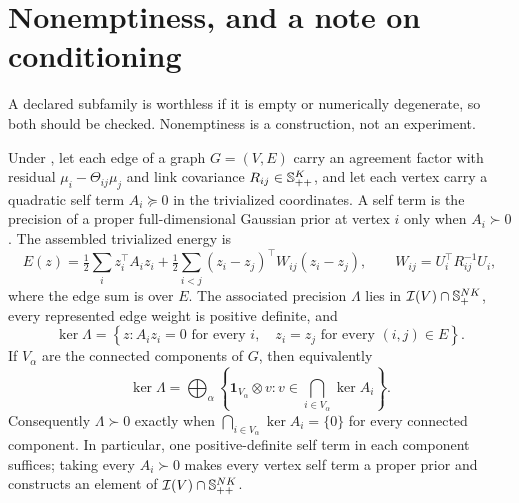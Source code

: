 \section{Nonemptiness, and a note on conditioning}
\label{sec:gauss-nonempty}

A declared subfamily is worthless if it is empty or numerically degenerate, so both should be checked. Nonemptiness is a construction, not an experiment.

Under , let each edge of a graph
$G=(V,E)$ carry an agreement factor with residual
$\mu_i-\Theta_{ij}\mu_j$ and link covariance
$R_{ij}\in\mathbb S_{++}^{K}$, and let each vertex carry a quadratic self
term $A_i\succeq0$ in the trivialized coordinates. A self term is the
precision of a proper full-dimensional Gaussian prior at vertex $i$ only
when $A_i\succ0$. The assembled trivialized energy is
\begin{equation}
E(z)=\tfrac12\sum_{i}z_i^\top A_iz_i
+\tfrac12\sum_{i<j}\left(z_i-z_j\right)^\top W_{ij}\left(z_i-z_j\right),
\qquad
W_{ij}=U_i^\top R_{ij}^{-1}U_i,
\label{eq:gauss-nonempty-construction}
\end{equation}
where the edge sum is over $E$. The associated precision
$\Lambda$ lies in $\mathcal I(V)\cap\mathbb S_{+}^{NK}$, every represented edge
weight is positive definite, and
\begin{equation}
\ker\Lambda
=\left\{z:A_iz_i=0\text{ for every }i,
\quad z_i=z_j\text{ for every }(i,j)\in E\right\}.
\label{eq:gauss-nonempty-kernel}
\end{equation}
If $V_\alpha$ are the connected components of $G$, then equivalently
\begin{equation}
\ker\Lambda
=\bigoplus_\alpha
\left\{\mathbf1_{V_\alpha}\otimes v:
v\in\bigcap_{i\in V_\alpha}\ker A_i\right\}.
\label{eq:gauss-nonempty-component-kernel}
\end{equation}
Consequently $\Lambda\succ0$ exactly when
$\bigcap_{i\in V_\alpha}\ker A_i=\{0\}$ for every connected component.
In particular, one positive-definite self term in each component suffices;
taking every $A_i\succ0$ makes every vertex self term a proper prior and
constructs an element of
$\mathcal I(V)\cap\mathbb S_{++}^{NK}$. 

